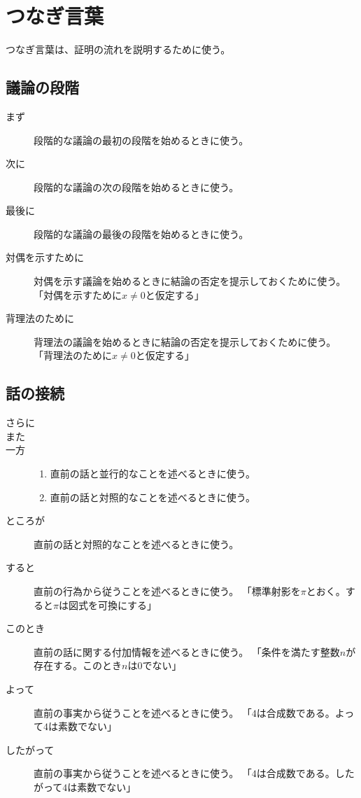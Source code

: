 \documentclass[report]{jlreq}
\begin{document}
%
\section{つなぎ言葉}

つなぎ言葉は、証明の流れを説明するために使う。

\subsection{議論の段階}

\begin{description}
    \item[まず]
        段階的な議論の最初の段階を始めるときに使う。
    \item[次に]
        段階的な議論の次の段階を始めるときに使う。
    \item[最後に]
        段階的な議論の最後の段階を始めるときに使う。

    \item[対偶を示すために]
        対偶を示す議論を始めるときに結論の否定を提示しておくために使う。
        「対偶を示すために$x \neq 0$と仮定する」
    \item[背理法のために]
        背理法の議論を始めるときに結論の否定を提示しておくために使う。
        「背理法のために$x \neq 0$と仮定する」
\end{description}

\subsection{話の接続}

\begin{description}
    \item[さらに]
    \item[また]

    \item[一方]
        \begin{enumerate}
            \item 直前の話と並行的なことを述べるときに使う。
            \item 直前の話と対照的なことを述べるときに使う。
        \end{enumerate}
    \item[ところが]
        直前の話と対照的なことを述べるときに使う。

    \item[すると]
        直前の行為から従うことを述べるときに使う。
        「標準射影を$\pi$とおく。すると$\pi$は図式を可換にする」
    \item[このとき]
        直前の話に関する付加情報を述べるときに使う。
        「条件を満たす整数$n$が存在する。このとき$n$は$0$でない」
    \item[よって]
        直前の事実から従うことを述べるときに使う。
        「$4$は合成数である。よって$4$は素数でない」
    \item[したがって]
        直前の事実から従うことを述べるときに使う。
        「$4$は合成数である。したがって$4$は素数でない」
\end{description}
\end{document}
